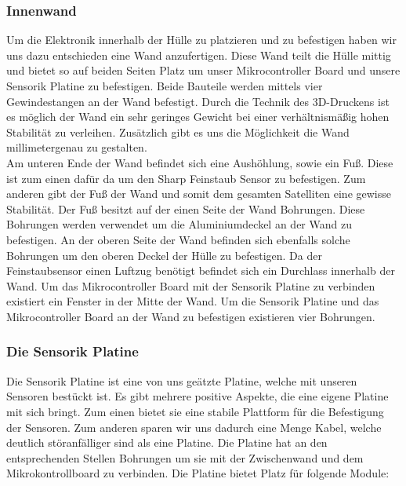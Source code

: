 \subsubsection{Innenwand}
Um die Elektronik innerhalb der Hülle zu platzieren und zu befestigen haben wir uns dazu entschieden eine Wand anzufertigen. Diese Wand teilt die Hülle mittig und bietet so auf beiden Seiten Platz um unser Mikrocontroller Board und unsere Sensorik Platine zu befestigen. Beide Bauteile werden mittels vier Gewindestangen an der Wand befestigt. Durch die Technik des 3D-Druckens ist es möglich der Wand ein sehr geringes Gewicht bei einer verhältnismäßig hohen Stabilität zu verleihen. Zusätzlich gibt es uns die Möglichkeit die Wand millimetergenau zu gestalten. \\
Am unteren Ende der Wand befindet sich eine Aushöhlung, sowie ein Fuß. Diese ist zum einen dafür da um den Sharp Feinstaub Sensor zu befestigen. Zum anderen gibt der Fuß der Wand und somit dem gesamten Satelliten eine gewisse Stabilität. Der Fuß besitzt auf der einen Seite der Wand Bohrungen. Diese Bohrungen werden verwendet um die Aluminiumdeckel an der Wand zu befestigen. An der oberen Seite der Wand befinden sich ebenfalls solche Bohrungen um den oberen Deckel der Hülle zu befestigen. Da der Feinstaubsensor einen Luftzug benötigt befindet sich ein Durchlass innerhalb der Wand. Um das Mikrocontroller Board mit der Sensorik Platine zu verbinden existiert ein Fenster in der Mitte der Wand. Um die Sensorik Platine und das Mikrocontroller Board an der Wand zu befestigen existieren vier Bohrungen.

\subsubsection{Die Sensorik Platine}
Die Sensorik Platine ist eine von uns geätzte Platine, welche mit unseren Sensoren bestückt ist. Es gibt mehrere positive Aspekte, die eine eigene Platine mit sich bringt. Zum einen bietet sie eine stabile Plattform für die Befestigung der Sensoren. Zum anderen sparen wir uns dadurch eine Menge Kabel, welche deutlich störanfälliger sind als eine Platine. Die Platine hat an den entsprechenden Stellen Bohrungen um sie mit der Zwischenwand und dem Mikrokontrollboard zu verbinden. Die Platine bietet Platz für folgende Module:

